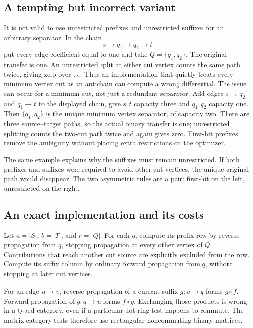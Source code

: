 \documentclass[11pt,letterpaper]{article}
\theoremstyle{definition}\newtheorem{definition}[theorem]{Definition}
\theoremstyle{remark}\newtheorem{remark}[theorem]{Remark}
\newcommand{\F}{\mathbb F_2}
\begin{document}
\subsection{A tempting but incorrect variant}
It is not valid to use unrestricted prefixes and unrestricted suffixes for
an arbitrary separator. In the chain
\[
s\longrightarrow q_1\longrightarrow q_2\longrightarrow t
\]
put every edge coefficient equal to one and take $Q=\{q_1,q_2\}$.
The original transfer is one. An unrestricted split at either cut vertex
counts the same path twice, giving zero over $\F$. Thus an implementation
that quietly treats every minimum vertex cut as an antichain can compute a
wrong differential. The issue can occur for a minimum cut, not just a
redundant separator. Add edges $s\to q_2$ and $q_1\to t$ to the displayed
chain, give $s,t$ capacity three and $q_1,q_2$ capacity one. Then
$\{q_1,q_2\}$ is the unique minimum vertex separator, of capacity two.
There are three source--target paths, so the actual binary transfer is one;
unrestricted splitting counts the two-cut path twice and again gives zero.
First-hit prefixes remove the ambiguity without placing extra restrictions
on the optimizer.

The same example explains why the suffixes must remain unrestricted. If
both prefixes and suffixes were required to avoid other cut vertices, the
unique original path would disappear. The two asymmetric rules are a pair:
first-hit on the left, unrestricted on the right.

\subsection{An exact implementation and its costs}
Let $a=|S|$, $b=|T|$, and $r=|Q|$. For each $q$, compute its prefix row by
reverse propagation from $q$, stopping propagation at every other vertex of
$Q$. Contributions that reach another cut source are explicitly excluded
from the row. Compute its suffix column by ordinary forward propagation
from $q$, without stopping at later cut vertices.

For an edge $u\xrightarrow{f}v$, reverse propagation of a current suffix
$g:v\to q$ forms $g\circ f$. Forward propagation of $g:q\to u$ forms
$f\circ g$. Exchanging those products is wrong in a typed category, even
if a particular dot-ring test happens to commute. The matrix-category tests
therefore use rectangular noncommuting binary matrices.
\end{document}
